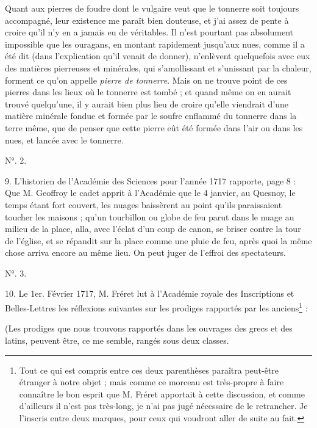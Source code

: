 \documentclass[a4paper, 11pt, oneside, polutonikogreek, french]{article}
\begin{document}
\og Quant aux pierres de foudre dont le vulgaire veut que le tonnerre soit toujours accompagné, leur existence me paraît bien douteuse, et j'ai assez de pente à croire qu'il n'y en a jamais eu de véritables. Il n'est pourtant pas absolument impossible que les ouragans, en montant rapidement jusqu'aux nues, comme il a été dit (dans l'explication qu'il venait de donner), n'enlèvent quelquefois avec eux des matières pierreuses et minérales, qui s'amollissant et s'unissant par la chaleur, forment ce qu'on appelle \emph{pierre de tonnerre}. Mais on ne trouve point de ces pierres dans les lieux où le tonnerre est tombé ; et quand même on en aurait trouvé quelqu'une, il y aurait bien plus lieu de croire qu'elle viendrait d'une matière minérale fondue et formée par le soufre enflammé du tonnerre dans la terre même, que de penser que cette pierre eût été formée dans l'air ou dans les nues, et lancée avec le tonnerre. \fg

\begin{center}
N°. 2.
\end{center}

9. L'historien de l'Académie des Sciences pour l'année 1717 rapporte, page 8 : \og Que M. Geoffroy le cadet apprit à l'Académie que le 4 janvier, au Quesnoy, le temps étant fort couvert, les nuages baissèrent au point qu'ils paraissaient toucher les maisons ; qu'un tourbillon ou globe de feu parut dans le nuage au milieu de la place, alla, avec l'éclat d'un coup de canon, se briser contre la tour de l'église, et se répandit sur la place comme une pluie de feu, après quoi la même chose arriva encore au même lieu. On peut juger de l'effroi des spectateurs. \fg

\begin{center}
N°. 3.
\end{center}

10. Le 1er. Février 1717, M. Fréret lut à l'Académie royale des Inscriptions et Belles-Lettres les réflexions suivantes sur les prodiges rapportés par les anciens\footnote{Tout ce qui est compris entre ces deux parenthèses paraîtra peut-être étranger à notre objet ; mais comme ce morceau est très-propre à faire connaître le bon esprit que M. Fréret apportait à cette discussion, et comme d'ailleurs il n'est pas très-long, je n'ai pas jugé nécessaire de le retrancher. Je l'inscris entre deux marques, pour ceux qui voudront aller de suite au fait.} :

\og (Les prodiges que nous trouvons rapportés dans les ouvrages des grecs et des latins, peuvent être, ce me semble, rangés sous deux classes. \fg
\end{document}
